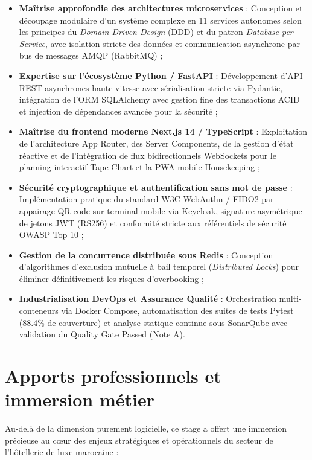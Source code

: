 \begin{itemize}
    \item \textbf{Maîtrise approfondie des architectures microservices} : Conception et découpage modulaire d'un système complexe en 11 services autonomes selon les principes du \textit{Domain-Driven Design} (DDD) et du patron \textit{Database per Service}, avec isolation stricte des données et communication asynchrone par bus de messages AMQP (RabbitMQ) ;
    \item \textbf{Expertise sur l'écosystème Python / FastAPI} : Développement d'API REST asynchrones haute vitesse avec sérialisation stricte via Pydantic, intégration de l'ORM SQLAlchemy avec gestion fine des transactions ACID et injection de dépendances avancée pour la sécurité ;
    \item \textbf{Maîtrise du frontend moderne Next.js 14 / TypeScript} : Exploitation de l'architecture App Router, des Server Components, de la gestion d'état réactive et de l'intégration de flux bidirectionnels WebSockets pour le planning interactif Tape Chart et la PWA mobile Housekeeping ;
    \item \textbf{Sécurité cryptographique et authentification sans mot de passe} : Implémentation pratique du standard W3C WebAuthn / FIDO2 par appairage QR code sur terminal mobile via Keycloak, signature asymétrique de jetons JWT (RS256) et conformité stricte aux référentiels de sécurité OWASP Top 10 ;
    \item \textbf{Gestion de la concurrence distribuée sous Redis} : Conception d'algorithmes d'exclusion mutuelle à bail temporel (\textit{Distributed Locks}) pour éliminer définitivement les risques d'overbooking ;
    \item \textbf{Industrialisation DevOps et Assurance Qualité} : Orchestration multi-conteneurs via Docker Compose, automatisation des suites de tests Pytest (88.4\% de couverture) et analyse statique continue sous SonarQube avec validation du Quality Gate Passed (Note A).
\end{itemize}

\section{Apports professionnels et immersion métier}

Au-delà de la dimension purement logicielle, ce stage a offert une immersion précieuse au cœur des enjeux stratégiques et opérationnels du secteur de l'hôtellerie de luxe marocaine :

